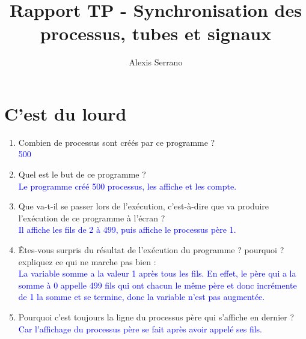 \documentclass{article}
\title{Rapport TP - Synchronisation des processus, tubes et signaux}
\author{Alexis Serrano}
\begin{document}
	\maketitle
	\section{C’est du lourd}
	\begin{enumerate}
		\item Combien de processus sont créés par ce programme ? \\
			\textcolor{blue}{500} \\
		\item Quel est le but de ce programme ? \\
			\textcolor{blue}{Le programme créé 500 processus, les affiche et les compte. } \\
		\item Que va-t-il se passer lors de l’exécution, c’est-à-dire que va produire l’exécution de ce programme à l’écran ? \\
			\textcolor{blue}{Il affiche les fils de 2 à 499, puis affiche le processus père 1.} \\
		\item Êtes-vous surpris du résultat de l’exécution du programme ? pourquoi ? expliquez ce
		qui ne marche pas bien : \\
			\textcolor{blue}{La variable somme a la valeur 1 après tous les fils. En effet, le père qui a la somme à 0 appelle 499 fils qui ont chacun le même père et donc incrémente de 1 la somme et se termine, donc la variable n'est pas augmentée.} \\
		\item Pourquoi c’est toujours la ligne du processus père qui s’affiche en dernier ? \\
			\textcolor{blue}{Car l'affichage du processus père se fait après avoir appelé ses fils.} \\
	\end{enumerate}
	
\end{document}
